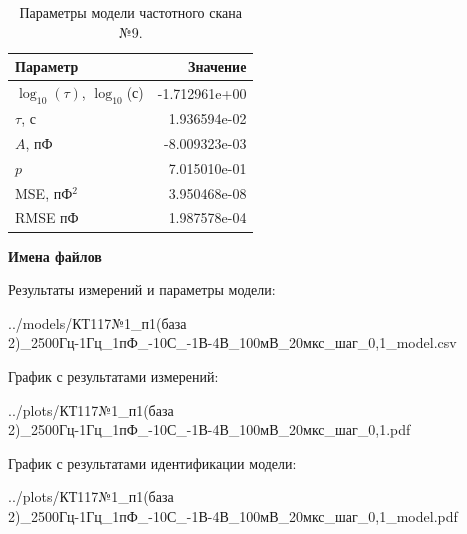 \begin{table}[!ht]
    \centering
    \caption{Параметры модели частотного скана №9.}
    \begin{tabular}{|l|r|}
        \hline
        Параметр                                       & Значение                  \\ \hline
        $\log_{10}(\tau)$, $\log_{10}$(с)              & -1.712961e+00             \\ \hline
        $\tau$, с                                      & 1.936594e-02              \\ \hline
        $A$, пФ                                        & -8.009323e-03             \\ \hline
        $p$                                            & 7.015010e-01              \\ \hline
        MSE, пФ$^2$                                    & 3.950468e-08              \\ \hline
        RMSE пФ                                        & 1.987578e-04              \\ \hline
    \end{tabular}
    \label{table:frequency_scan_model_9}
\end{table}

\textbf{Имена файлов}

Результаты измерений и параметры модели:

\scriptsize../models/КТ117№1\_п1(база 2)\_2500Гц-1Гц\_1пФ\_-10С\_-1В-4В\_100мВ\_20мкс\_шаг\_0,1\_model.csv
\normalsize

График с результатами измерений:

\scriptsize../plots/КТ117№1\_п1(база 2)\_2500Гц-1Гц\_1пФ\_-10С\_-1В-4В\_100мВ\_20мкс\_шаг\_0,1.pdf
\normalsize

График с результатами идентификации модели:

\scriptsize../plots/КТ117№1\_п1(база 2)\_2500Гц-1Гц\_1пФ\_-10С\_-1В-4В\_100мВ\_20мкс\_шаг\_0,1\_model.pdf
\normalsize

